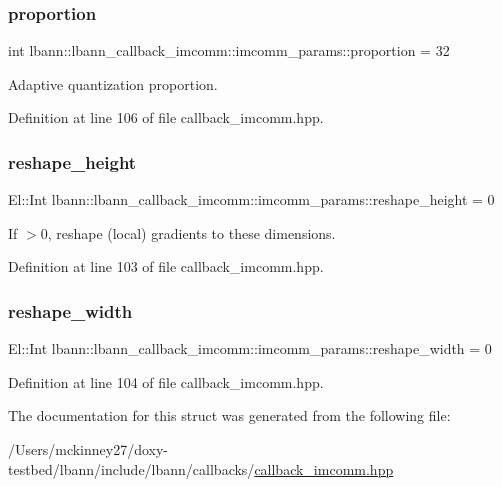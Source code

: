 \subsubsection{\texorpdfstring{proportion}{proportion}}
{\footnotesize\ttfamily int lbann\+::lbann\+\_\+callback\+\_\+imcomm\+::imcomm\+\_\+params\+::proportion = 32}

Adaptive quantization proportion. 

Definition at line 106 of file callback\+\_\+imcomm.\+hpp.

\mbox{\label{structlbann_1_1lbann__callback__imcomm_1_1imcomm__params_a6e188e3683cb4d8cb562176417463cb5}} 
\subsubsection{\texorpdfstring{reshape\+\_\+height}{reshape\_height}}
{\footnotesize\ttfamily El\+::\+Int lbann\+::lbann\+\_\+callback\+\_\+imcomm\+::imcomm\+\_\+params\+::reshape\+\_\+height = 0}

If $>$0, reshape (local) gradients to these dimensions. 

Definition at line 103 of file callback\+\_\+imcomm.\+hpp.

\mbox{\label{structlbann_1_1lbann__callback__imcomm_1_1imcomm__params_a3b2be3a390f473acdf1b9d72c5d240f0}} 
\subsubsection{\texorpdfstring{reshape\+\_\+width}{reshape\_width}}
{\footnotesize\ttfamily El\+::\+Int lbann\+::lbann\+\_\+callback\+\_\+imcomm\+::imcomm\+\_\+params\+::reshape\+\_\+width = 0}



Definition at line 104 of file callback\+\_\+imcomm.\+hpp.



The documentation for this struct was generated from the following file\+:\begin{DoxyCompactItemize}
\item 
/\+Users/mckinney27/doxy-\/testbed/lbann/include/lbann/callbacks/\hyperlink{callback__imcomm_8hpp}{callback\+\_\+imcomm.\+hpp}\end{DoxyCompactItemize}
